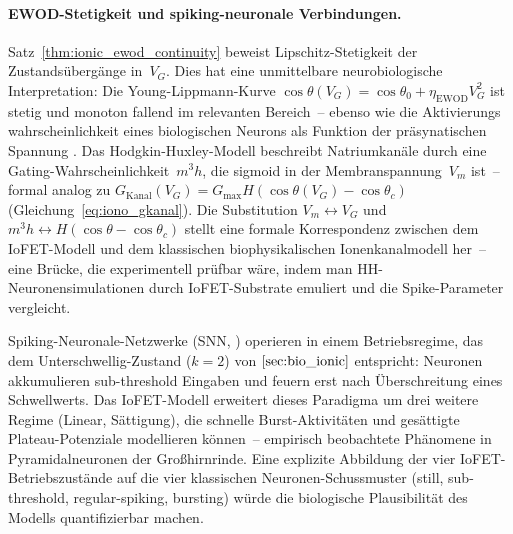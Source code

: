 \documentclass[12pt, a4paper, openany]{report}
\begin{document}
\paragraph{EWOD-Stetigkeit und spiking-neuronale Verbindungen.}
Satz~\ref{thm:ionic_ewod_continuity} beweist Lipschitz-Stetigkeit der
Zustandsübergänge in~$V_G$.  Dies hat eine unmittelbare neurobiologische
Interpretation: Die Young-Lippmann-Kurve
$\cos\theta(V_G) = \cos\theta_0 + \eta_{\text{EWOD}} V_G^2$ ist stetig
und monoton fallend im relevanten Bereich~-- ebenso wie die Aktivierungs\-
wahrscheinlichkeit eines biologischen Neurons als Funktion der präsynatischen
Spannung \cite{hodgkin52}.  Das Hodgkin-Huxley-Modell \cite{hodgkin52}
beschreibt Natriumkanäle durch eine Gating-Wahrscheinlichkeit~$m^3 h$, die
sigmoid in der Membranspannung~$V_m$ ist~-- formal analog zu
$G_{\text{Kanal}}(V_G) = G_{\max} H(\cos\theta(V_G) - \cos\theta_c)$
(Gleichung~\ref{eq:iono_gkanal}).  Die Substitution $V_m \leftrightarrow V_G$
und $m^3 h \leftrightarrow H(\cos\theta - \cos\theta_c)$ stellt eine
formale Korrespondenz zwischen dem IoFET-Modell und dem klassischen
biophysikalischen Ionenkanal\-modell her~-- eine Brücke, die experimentell
prüfbar wäre, indem man HH-Neuronensimulationen durch IoFET-Substrate
emuliert und die Spike-Parameter vergleicht.

Spiking-Neuronale-Netzwerke (SNN, \cite{maass97}) operieren in einem
Betriebsregime, das dem Unterschwellig-Zustand ($k=2$) von
$\cref{sec:bio_ionic}$ entspricht: Neuronen akkumulieren sub-threshold
Eingaben und feuern erst nach Überschreitung eines Schwellwerts.  Das
IoFET-Modell erweitert dieses Paradigma um drei weitere Regime (Linear,
Sättigung), die schnelle Burst-Aktivitäten und gesättigte Plateau-Potenziale
modellieren können~-- empirisch beobachtete Phänomene in Pyramidalneuronen
der Großhirnrinde.  Eine explizite Abbildung der vier IoFET-Betriebszustände
auf die vier klassischen Neuronen-Schussmuster (still, sub-threshold,
regular-spiking, bursting) würde die biologische Plausibilität des Modells
quantifizierbar machen.
\end{document}
